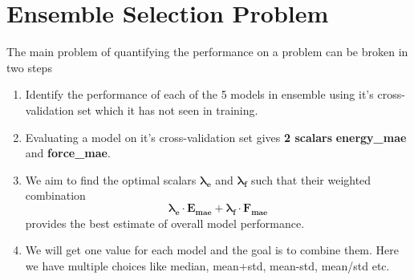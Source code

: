 \documentclass[12pt]{article}
\theoremstyle{definition}
\theoremstyle{remark}
\begin{document}
\section{Ensemble Selection Problem}
The main problem of quantifying the performance on a problem can be broken in two steps
\begin{enumerate}
    \item Identify the performance of each of the 5 models in ensemble using it's cross-validation set which it has not seen in training. 
    \item Evaluating a model on it's cross-validation set gives \textbf{2 scalars} \textbf{energy\_mae} and \textbf{force\_mae}. 
\item We aim to find the optimal scalars $\mathbf{\lambda_e}$ and $\mathbf{\lambda_f}$ such that their weighted combination
\begin{equation}
    \mathbf{\lambda_e \cdot E_{\text{mae}} + \lambda_f \cdot F_{\text{mae} }}
\end{equation}
provides the best estimate of overall model performance.
\item We will get one value for each model and the goal is to combine them. Here we have multiple choices like median, mean+std, mean-std, mean/std etc.
\end{enumerate}
\newpage
\end{document}
